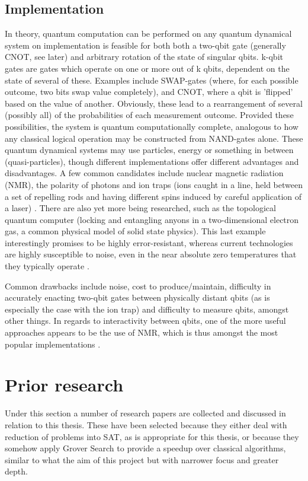 \documentclass[msc,lith,english]{liuthesis}
\begin{document}
\subsection{Implementation}
In theory, quantum computation can be performed on any quantum dynamical system on implementation is feasible for both both a two-qbit gate (generally CNOT, see later) and arbitrary rotation of the state of singular qbits. k-qbit gates are gates which operate on one or more out of k qbits, dependent on the state of several of these. Examples include SWAP-gates (where, for each possible outcome, two bits swap value completely), and CNOT, where a qbit is 'flipped' based on the value of another. Obviously, these lead to a rearrangement of several (possibly all) of the probabilities of each measurement outcome\cite{QCQI}. Provided these possibilities, the system is quantum computationally complete, analogous to how any classical logical operation may be constructed from NAND-gates alone. These quantum dynamical systems may use particles, energy or something in between (quasi-particles), though different implementations offer different advantages and disadvantages. A few common candidates include nuclear magnetic radiation (NMR), the polarity of photons and ion traps (ions caught in a line, held between a set of repelling rods and having different spins induced by careful application of a laser) \cite{QCQI}\cite{EIQC}. There are also yet more being researched, such as the topological quantum computer (locking and entangling anyons in a two-dimensional electron gas, a common physical model of solid state physics). This last example interestingly promises to be highly error-resistant, whereas current technologies are highly susceptible to noise, even in the near absolute zero temperatures that they typically operate \cite{EIQC}. 

Common drawbacks include noise, cost to produce/maintain, difficulty in accurately enacting two-qbit gates between physically distant qbits (as is especially the case with the ion trap) and difficulty to measure qbits, amongst other things. In regards to interactivity between qbits, one of the more useful approaches appears to be the use of NMR, which is thus amongst the most popular implementations \cite{QCQI}.

\section{Prior research}
Under this section a number of research papers are collected and discussed in relation to this thesis. These have been selected because they either deal with reduction of problems into SAT, as is appropriate for this thesis, or because they somehow apply Grover Search to provide a speedup over classical algorithms, similar to what the aim of this project but with narrower focus and greater depth.
\end{document}
